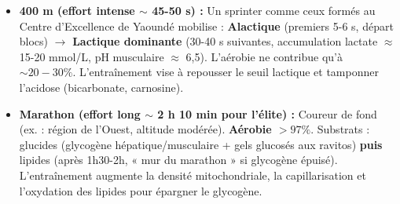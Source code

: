 \documentclass[11pt]{article}
\begin{document}
\begin{exemplebox}
\begin{itemize}
    \item \textbf{400 m (effort intense $\sim$ 45-50 s) :} Un sprinter comme ceux formés au Centre d'Excellence de Yaoundé mobilise : \textbf{Alactique} (premiers 5-6 s, départ blocs) $\rightarrow$ \textbf{Lactique dominante} (30-40 s suivantes, accumulation lactate $\approx$ 15-20 mmol/L, pH musculaire $\approx$ 6,5). L'aérobie ne contribue qu'à $\sim 20-30\%$. L'entraînement vise à repousser le seuil lactique et tamponner l'acidose (bicarbonate, carnosine).
    \item \textbf{Marathon (effort long $\sim$ 2 h 10 min pour l'élite) :} Coureur de fond (ex. : région de l'Ouest, altitude modérée). \textbf{Aérobie $> 97\%$}. Substrats : glucides (glycogène hépatique/musculaire + gels glucosés aux ravitos) \textbf{puis} lipides (après 1h30-2h, « mur du marathon » si glycogène épuisé). L'entraînement augmente la densité mitochondriale, la capillarisation et l'oxydation des lipides pour épargner le glycogène.
\end{itemize}
\end{exemplebox}
\end{document}
